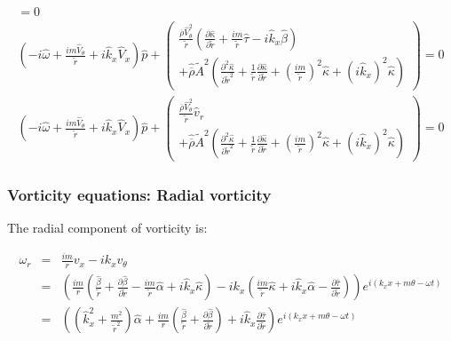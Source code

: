 \documentclass[12pt]{article}
\begin{document}
\begin{eqnarray}
 = 
0
\nonumber
\\
\left(
-i \widehat{\omega}
+ \frac{i m \widehat{V}_{\theta}}{\widetilde{r}}
+i \widehat{k}_x \widehat{V}_x 
\right) 
\widehat{p} 
+
\left(
\begin{array}{r}
\frac{\overline{\rho} \widehat{V}_{\theta}^2}{\widetilde{r}}
\left(
\frac{\partial \widehat{\kappa}}{\partial \widetilde{r}}
+
\frac{i m}{\widetilde{r}}
\widehat{\tau}
-
i \widehat{k}_x \widehat{\beta}
\right) 
\\
+ 
\widehat{\overline{\rho}} \widetilde{A}^2
\left(
\frac{\partial^2 \widehat{\kappa}}{\partial \widetilde{r}^2}
+ 
\frac{1}{\widetilde{r}} 
\frac{\partial \widehat{\kappa}}{\partial \widetilde{r}}
+
\left(\frac{i m}{\widetilde{r}} \right)^2 \widehat{\kappa}
+ 
\left(i \widehat{k}_x \right)^2 \widehat{\kappa}
\right)
\end{array}
\right)
 = 
0
\nonumber
\\
\left(
-i \widehat{\omega}
+ \frac{i m \widehat{V}_{\theta}}{\widetilde{r}}
+i \widehat{k}_x \widehat{V}_x 
\right) 
\widehat{p} 
+
\left(
\begin{array}{r}
\frac{\overline{\rho} \widehat{V}_{\theta}^2}{\widetilde{r}}
\widehat{v}_r
\\
+ 
\widehat{\overline{\rho}} \widetilde{A}^2
\left(
\frac{\partial^2 \widehat{\kappa}}{\partial \widetilde{r}^2}
+ 
\frac{1}{\widetilde{r}} 
\frac{\partial \widehat{\kappa}}{\partial \widetilde{r}}
+
\left(\frac{i m}{\widetilde{r}} \right)^2 \widehat{\kappa}
+ 
\left(i \widehat{k}_x \right)^2 \widehat{\kappa}
\right)
\end{array}
\right)
 = 
0
\nonumber
\end{eqnarray}

\subsubsection{Vorticity equations: Radial vorticity}

The radial component of vorticity is:

\begin{eqnarray}
\omega_r &=&
\frac{im}{r} 
v_x 
- 
i k_x 
v_{\theta}
\nonumber
\\
&=&
\left(
\frac{im}{r} 
\left(
\frac{\widehat{\beta}}{\widetilde{r}}
+\frac{\partial \widehat{\beta}}{\partial \widetilde{r}}
-
\frac{i m}{\widetilde{r}}
\widehat{\alpha}
+ i \widehat{k}_x \widehat{\kappa}
\right) 
-
i k_x 
\left(
\frac{i m}{\widetilde{r}} \widehat{\kappa}
+
i \widehat{k}_x \widehat{\alpha}
-
\frac{\partial \widehat{\tau}}{\partial \widetilde{r}}
\right) 
\right)
e^{i \left(k_x x + m \theta - \omega t \right)} 
\nonumber
\\
&=&
\left(
\left(\widehat{k}_x^2 + \frac{m^2}{\widetilde{r}^2} \right) \widehat{\alpha}
+
\frac{im}{r} 
\left(
\frac{\widehat{\beta}}{\widetilde{r}}
+\frac{\partial \widehat{\beta}}{\partial \widetilde{r}}
\right)
+i \widehat{k}_x 
\frac{\partial \widehat{\tau}}{\partial \widetilde{r}}
\right)
e^{i \left(k_x x + m \theta - \omega t \right)} 
\nonumber
\end{eqnarray}
\end{document}
